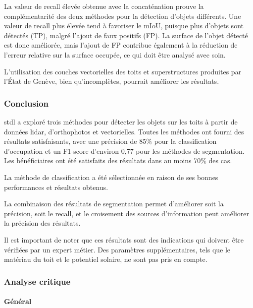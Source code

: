\par{La valeur de recall élevée obtenue avec la concaténation prouve la complémentarité des deux méthodes pour la détection d'objets différents. Une valeur de recall plus élevée tend à favoriser le mIoU, puisque plus d'objets sont détectés (TP), malgré l'ajout de faux positifs (FP). La surface de l'objet détecté est donc améliorée, mais l'ajout de FP contribue également à la réduction de l'erreur relative sur la surface occupée, ce qui doit être analysé avec soin.}

\par{L'utilisation des couches vectorielles des toits et superstructures produites par l'État de Genève, bien qu'incomplètes, pourrait améliorer les résultats.}

\subsubsection{Conclusion}

\par{\acrshort{stdl} a exploré trois méthodes pour détecter les objets sur les toits à partir de données \gls{lidar}, d'orthophotos et vectorielles. Toutes les méthodes ont fourni des résultats satisfaisants, avec une précision de 85\% pour la classification d'occupation et un F1-score d'environ 0,77 pour les méthodes de segmentation. Les bénéficiaires ont été satisfaits des résultats dans au moins 70\% des cas.}

\par{La méthode de classification a été sélectionnée en raison de ses bonnes performances et résultats obtenus.}

\par{La combinaison des résultats de segmentation permet d'améliorer soit la précision, soit le recall, et le croisement des sources d'information peut améliorer la précision des résultats.}

\par{Il est important de noter que ces résultats sont des indications qui doivent être vérifiées par un expert métier. Des paramètres supplémentaires, tels que le matériau du toit et le potentiel solaire, ne sont pas pris en compte.}

\subsubsection{Analyse critique}

\paragraph{Général}

